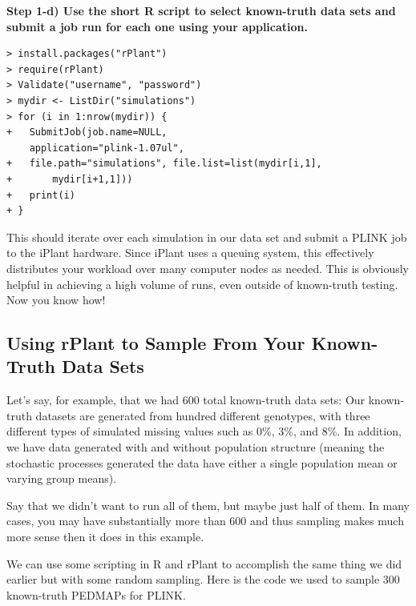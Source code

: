 \documentclass[twoside,a4paper]{refart}
\begin{document}
\textbf{Step 1-d) Use the short R script to select known-truth data sets and submit a job run for each one using your application.}

\begin{center}
\begin{lstlisting}[frame=single]
> install.packages("rPlant")
> require(rPlant)
> Validate("username", "password")
> mydir <- ListDir("simulations")
> for (i in 1:nrow(mydir)) {
+	SubmitJob(job.name=NULL, 
	application="plink-1.07ul", 
+	file.path="simulations", file.list=list(mydir[i,1], 
+		mydir[i+1,1]))
+	print(i)
+ }
\end{lstlisting}
\end{center}

This should iterate over each simulation in our data set and submit a PLINK job to the iPlant hardware. Since iPlant uses a queuing system, this effectively distributes your workload over many computer nodes as needed. This is obviously helpful in achieving a high volume of runs, even outside of known-truth testing. Now you know how!

\subsection{Using rPlant to Sample From Your Known-Truth Data Sets}

Let's say, for example, that we had 600 total known-truth data sets: Our known-truth datasets are generated from hundred different genotypes, with three different types of simulated missing values such as 0\%, 3\%, and 8\%. In addition, we have data generated with and without population structure (meaning the stochastic processes generated the data have either a single population mean or varying group means). 

Say that we didn't want to run all of them, but maybe just half of them. In many cases, you may have substantially more than 600 and thus sampling makes much more sense then it does in this example. 

We can use some scripting in R and rPlant to accomplish the same thing we did earlier but with some random sampling. Here is the code we used to sample 300 known-truth PEDMAPs for PLINK.
\end{document}
